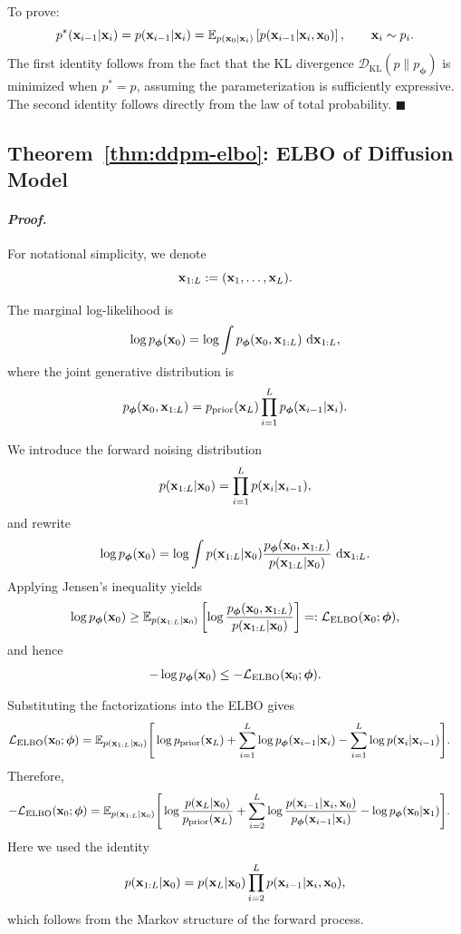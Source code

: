  To prove:
\[
p^*({\mathbf{x}}_{i-1}|{\mathbf{x}}_i)
=
p({\mathbf{x}}_{i-1}|{\mathbf{x}}_i)
=
\mathbb{E}_{p({\mathbf{x}}_0|{\mathbf{x}}_i)}
\left[
p({\mathbf{x}}_{i-1}|{\mathbf{x}}_i,{\mathbf{x}}_0)
\right],
\qquad
{\mathbf{x}}_i \sim p_i.
\]
The first identity follows from the fact that the KL divergence $\mathcal{D}_{\mathrm{KL}}(p \| p_{\bm{\phi}})$ is minimized when $p^* = p$, assuming the parameterization is sufficiently expressive. The second identity follows directly from the law of total probability.
\hfill$\blacksquare$



\subsection{Theorem~\ref{thm:ddpm-elbo}: ELBO of Diffusion Model}\label{app:vlb-proof}

\paragraph{\textit{Proof.}} For notational simplicity, we denote
\[
{\mathbf{x}}_{1:L}:=({\mathbf{x}}_1,\ldots,{\mathbf{x}}_L).
\]

The marginal log-likelihood is
\[
\log p_{\bm{\phi}}({\mathbf{x}}_0)
=
\log \int p_{\bm{\phi}}({\mathbf{x}}_0,{\mathbf{x}}_{1:L})\,\mathop{}\!\mathrm{d} {\mathbf{x}}_{1:L},
\]
where the joint generative distribution is
\[
p_{\bm{\phi}}({\mathbf{x}}_0,{\mathbf{x}}_{1:L})
=
p_{\text{prior}}({\mathbf{x}}_L)\prod_{i=1}^L p_{\bm{\phi}}({\mathbf{x}}_{i-1}| {\mathbf{x}}_i).
\]

We introduce the forward noising distribution
\[
p({\mathbf{x}}_{1:L}| {\mathbf{x}}_0)
=
\prod_{i=1}^L p({\mathbf{x}}_i| {\mathbf{x}}_{i-1}),
\]
and rewrite
\[
\log p_{\bm{\phi}}({\mathbf{x}}_0)
=
\log \int
p({\mathbf{x}}_{1:L}| {\mathbf{x}}_0)
\frac{p_{\bm{\phi}}({\mathbf{x}}_0,{\mathbf{x}}_{1:L})}{p({\mathbf{x}}_{1:L}| {\mathbf{x}}_0)}
\,\mathop{}\!\mathrm{d} {\mathbf{x}}_{1:L}.
\]
Applying Jensen's inequality yields
\[
\log p_{\bm{\phi}}({\mathbf{x}}_0)
\ge
\mathbb{E}_{p({\mathbf{x}}_{1:L}| {\mathbf{x}}_0)}
\left[
\log
\frac{p_{\bm{\phi}}({\mathbf{x}}_0,{\mathbf{x}}_{1:L})}{p({\mathbf{x}}_{1:L}| {\mathbf{x}}_0)}
\right]
=: \mathcal{L}_{\text{ELBO}}({\mathbf{x}}_0;\bm{\phi}),
\]
and hence
\[
-\log p_{\bm{\phi}}({\mathbf{x}}_0)
\le
-\mathcal{L}_{\text{ELBO}}({\mathbf{x}}_0;\bm{\phi}).
\]

Substituting the factorizations into the ELBO gives
\begin{align*}
\mathcal{L}_{\text{ELBO}}({\mathbf{x}}_0;\bm{\phi})
&=
\mathbb{E}_{p({\mathbf{x}}_{1:L}| {\mathbf{x}}_0)}
\Bigg[
\log p_{\text{prior}}({\mathbf{x}}_L)
+
\sum_{i=1}^L \log p_{\bm{\phi}}({\mathbf{x}}_{i-1}| {\mathbf{x}}_i)
-
\sum_{i=1}^L \log p({\mathbf{x}}_i| {\mathbf{x}}_{i-1})
\Bigg].
\end{align*}
Therefore,
\begin{align*}
-\mathcal{L}_{\text{ELBO}}({\mathbf{x}}_0;\bm{\phi})
&=
\mathbb{E}_{p({\mathbf{x}}_{1:L}| {\mathbf{x}}_0)}
\Bigg[
\log \frac{p({\mathbf{x}}_L| {\mathbf{x}}_0)}{p_{\text{prior}}({\mathbf{x}}_L)}
+
\sum_{i=2}^L
\log \frac{p({\mathbf{x}}_{i-1}| {\mathbf{x}}_i,{\mathbf{x}}_0)}{p_{\bm{\phi}}({\mathbf{x}}_{i-1}| {\mathbf{x}}_i)}
-
\log p_{\bm{\phi}}({\mathbf{x}}_0| {\mathbf{x}}_1)
\Bigg].
\end{align*}
Here we used the identity
\[
p({\mathbf{x}}_{1:L}| {\mathbf{x}}_0)
=
p({\mathbf{x}}_L| {\mathbf{x}}_0)\prod_{i=2}^L p({\mathbf{x}}_{i-1}| {\mathbf{x}}_i,{\mathbf{x}}_0),
\]
which follows from the Markov structure of the forward process.

